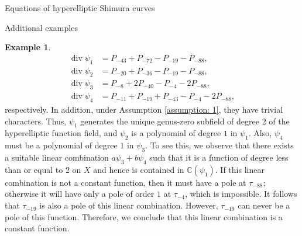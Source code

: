 \documentclass{amsart}
\newcounter{lemma}
\theoremstyle{definition}
\newtheorem{Example}[lemma]{Example}
\def\C{\mathbb C}
\def\div{\operatorname{div}}
\begin{document}
\begin{section}{Equations of hyperelliptic Shimura curves}
\begin{subsection}{Additional examples}
\begin{Example}
\begin{equation*}
\begin{split}
  \div\psi_{1}&=P_{-43}+P_{-72}-P_{-19}-P_{-88}, \\
  \div\psi_{2}&=P_{-20}+P_{-36}-P_{-19}-P_{-88}, \\
  \div\psi_{3}&=P_{-8}+2P_{-40}-P_{-4}-2P_{-88}, \\
  \div\psi_{4}&=P_{-11}+P_{-19}+P_{-43}-P_{-4}-2P_{-88},
\end{split}
\end{equation*}
respectively. In addition, under Assumption \ref{assumption: 1}, they
have trivial characters. Thus, $\psi_{1}$ generates the unique
genus-zero subfield of degree $2$ of the hyperelliptic function field, and
$\psi_{2}$ is a polynomial of degree $1$ in $\psi_{1}$. Also,
$\psi_{4}$ must be a polynomial of degree $1$ in $\psi_{3}$. To
see this, we observe that there exists a suitable linear combination
$a\psi_{3}+b\psi_{4}$ such that it is a function of degree less
than or equal to $2$ on $X$ and hence is contained in
$\C(\psi_{1})$. If this linear combination is not a constant
function, then it must have a pole at $\tau_{-88}$; otherwise it will
have only a pole of order $1$ at $\tau_{-4}$, which is impossible.
It follows that $\tau_{-19}$ is also a pole of this linear combination.
However, $\tau_{-19}$ can never be a pole of this function. Therefore, we
conclude that this linear combination is a constant function.


\end{Example}
\end{subsection}
\end{section}
\end{document}
